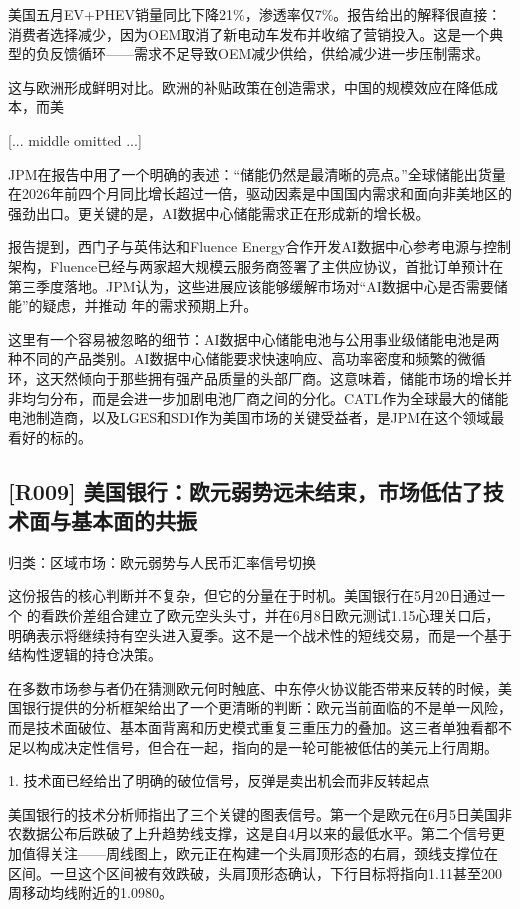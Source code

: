 \documentclass[11pt]{ctexart}
\begin{document}
美国五月EV+PHEV销量同比下降21\%，渗透率仅7\%。报告给出的解释很直接：消费者选择减少，因为OEM取消了新电动车发布并收缩了营销投入。这是一个典型的负反馈循环——需求不足导致OEM减少供给，供给减少进一步压制需求。

这与欧洲形成鲜明对比。欧洲的补贴政策在创造需求，中国的规模效应在降低成本，而美

[... middle omitted ...]

JPM在报告中用了一个明确的表述：“储能仍然是最清晰的亮点。”全球储能出货量在2026年前四个月同比增长超过一倍，驱动因素是中国国内需求和面向非美地区的强劲出口。更关键的是，AI数据中心储能需求正在形成新的增长极。

报告提到，西门子与英伟达和Fluence Energy合作开发AI数据中心参考电源与控制架构，Fluence已经与两家超大规模云服务商签署了主供应协议，首批订单预计在第三季度落地。JPM认为，这些进展应该能够缓解市场对“AI数据中心是否需要储能”的疑虑，并推动 年的需求预期上升。

这里有一个容易被忽略的细节：AI数据中心储能电池与公用事业级储能电池是两种不同的产品类别。AI数据中心储能要求快速响应、高功率密度和频繁的微循环，这天然倾向于那些拥有强产品质量的头部厂商。这意味着，储能市场的增长并非均匀分布，而是会进一步加剧电池厂商之间的分化。CATL作为全球最大的储能电池制造商，以及LGES和SDI作为美国市场的关键受益者，是JPM在这个领域最看好的标的。

\subsection{[R009] 美国银行：欧元弱势远未结束，市场低估了技术面与基本面的共振}
{\small\color{refgray}归类：区域市场：欧元弱势与人民币汇率信号切换}

这份报告的核心判断并不复杂，但它的分量在于时机。美国银行在5月20日通过一个 的看跌价差组合建立了欧元空头头寸，并在6月8日欧元测试1.15心理关口后，明确表示将继续持有空头进入夏季。这不是一个战术性的短线交易，而是一个基于结构性逻辑的持仓决策。

在多数市场参与者仍在猜测欧元何时触底、中东停火协议能否带来反转的时候，美国银行提供的分析框架给出了一个更清晰的判断：欧元当前面临的不是单一风险，而是技术面破位、基本面背离和历史模式重复三重压力的叠加。这三者单独看都不足以构成决定性信号，但合在一起，指向的是一轮可能被低估的美元上行周期。

1. 技术面已经给出了明确的破位信号，反弹是卖出机会而非反转起点

美国银行的技术分析师指出了三个关键的图表信号。第一个是欧元在6月5日美国非农数据公布后跌破了上升趋势线支撑，这是自4月以来的最低水平。第二个信号更加值得关注——周线图上，欧元正在构建一个头肩顶形态的右肩，颈线支撑位在 区间。一旦这个区间被有效跌破，头肩顶形态确认，下行目标将指向1.11甚至200周移动均线附近的1.0980。
\end{document}
